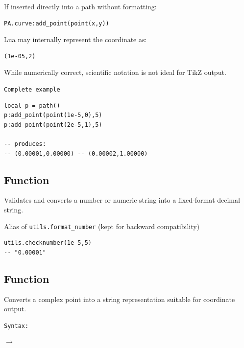 If inserted directly into a path without formatting:

\begin{verbatim}
PA.curve:add_point(point(x,y))
\end{verbatim}

Lua may internally represent the coordinate as:

\begin{verbatim}
(1e-05,2)
\end{verbatim}

While numerically correct, scientific notation is not ideal
for TikZ output.


\texttt{Complete example}

\begin{verbatim}
local p = path()
p:add_point(point(1e-5,0),5)
p:add_point(point(2e-5,1),5)

-- produces:
-- (0.00001,0.00000) -- (0.00002,1.00000)
\end{verbatim}





\subsection{Function }
\label{sub:function_utils_checknumber}

Validates and converts a number or numeric string into a fixed-format decimal string.

Alias of \verb|utils.format_number| (kept for backward compatibility)

\begin{verbatim}
utils.checknumber(1e-5,5)
-- "0.00001"
\end{verbatim}




\subsection{Function }
\label{sub:function_utils_format_point}

Converts a complex point into a string representation suitable for coordinate output.

\texttt{Syntax: }

\begin{center}
 \hfill $\rightarrow$ 
\end{center}


